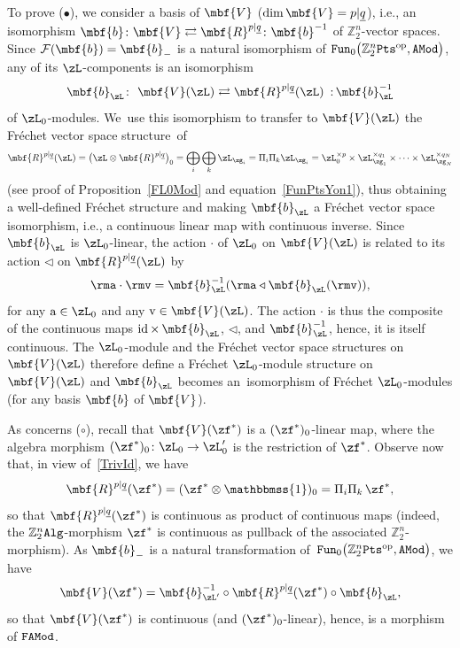 \documentclass[pdftex]{sigma}%
\newcommand{\Id}{\mathbbmss{1}}
\newcommand{\op}[1]{\operatorname{#1}}
\newcommand{\Z}{{\mathbb Z}}
\def\ul{\underline}
\def\cF{\mathcal{F}}
\def\ul{\underline}
\newcommand{\0}{\otimes}
\newcommand{\z}{\Z_2^n}
\numberwithin{equation}{section}
\begin{document}
To prove ($\bullet$), we consider a basis of $\mbf{V}$ ($\dim\mbf{V}=p|\ul q$), i.e., an isomorphism $\mbf{b}\colon \mbf{V}\rightleftarrows\mbf{R}^{p|\ul q}\colon \mbf{b}^{-1}$ of $\z$-vector spaces. Since $\cF(\mbf{b})=\mbf{b}_-$ is a natural isomorphism of ${\tt Fun}_0\big(\z{\tt Pts}^{\op{op}},{\tt AMod}\big)$, any of its $\zL$-components is an isomorphism
\[
\mbf{b}_\zL\colon\ \mbf{V}(\zL)\rightleftarrows\mbf{R}^{p|\ul q}(\zL)\ \,{:}\, \mbf{b}_\zL^{-1}
\]
of $\zL_0$-modules. We~use this isomorphism to transfer to $\mbf{V}(\zL)$ the Fr\'echet vector space struc\-ture~of
\begin{gather}\label{TrivId}
\mbf{R}^{p|\ul q}(\zL)=\big(\zL\0\mbf{R}^{p|\ul q}\big)_0=\bigoplus_i\bigoplus_k\zL_{\zg_i}=\Pi_i\Pi_k\zL_{\zg_i}=\zL_0^{\times p}\times\zL_{\zg_1}^{\times q_1}\times\cdots\times\zL_{\zg_N}^{\times q_N}
\end{gather}
(see proof of Proposition~\ref{FL0Mod} and equation~\eqref{FunPtsYon1}), thus obtaining a well-defined Fr\'echet structure and making $\mbf{b}_\zL$ a Fr\'echet vector space isomorphism, i.e., a continuous linear map with continuous inverse. Since $\mbf{b}_\zL$ is $\zL_0$-linear, the action $\cdot$ of $\zL_0$ on $\mbf{V}(\zL)$ is related to its action $\triangleleft$ on $\mbf{R}^{p|\ul q}(\zL)$ by
\[
\rma\cdot\rmv=\mbf{b}_\zL^{-1}(\rma\triangleleft\mbf{b}_\zL(\rmv)),
\]
for any $\textrm{a}\in\zL_0$ and any $\textrm{v}\in\mbf{V}(\zL)$. The action $\cdot$ is thus the composite of the continuous maps $\mathop{\rm id}\times\,\mbf{b}_\zL$, $\triangleleft$, and $\mbf{b}_\zL^{-1}$, hence, it is itself continuous. The $\zL_0$-module and the Fr\'echet vector space structures on $\mbf{V}(\zL)$ therefore define a Fr\'echet $\zL_0$-module structure on $\mbf{V}(\zL)$ and $\mbf{b}_\zL$ becomes an~isomorphism of Fr\'echet $\zL_0$-modules (for any basis $\mbf{b}$ of $\mbf{V}$).

As concerns ($\circ$), recall that $\mbf{V}(\zf^*)$ is a $(\zf^*)_0$-linear map, where the algebra morphism $(\zf^*)_0\colon \zL_0\to \zL'_0$ is the restriction of $\zf^*$. Observe now that, in view of~\eqref{TrivId}, we have
\[
\mbf{R}^{p|\ul q}(\zf^*)=(\zf^*\0\Id)_0=\Pi_i\Pi_k\,\zf^*,
\]
so that $\mbf{R}^{p|\ul q}(\zf^*)$ is continuous as product of continuous maps (indeed, the $\z\tt Alg$-morphism $\zf^*$ is continuous as pullback of the associated $\z$-morphism). As $\mbf{b}_-$ is a natural transformation of~${\tt Fun}_0\big(\z{\tt Pts}^{\op{op}},{\tt AMod}\big)$, we have
\[
\mbf{V}(\zf^*)=\mbf{b}_{\zL'}^{-1}\circ\mbf{R}^{p|\ul q}(\zf^*)\circ\mbf{b}_\zL,
\]
so that $\mbf{V}(\zf^*)$ is continuous (and $(\zf^*)_0$-linear), hence, is a morphism of $\tt FAMod$.
\end{document}
